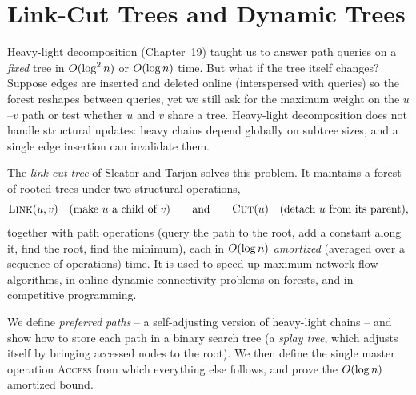 \chapter{Link-Cut Trees and Dynamic Trees}

Heavy-light decomposition (Chapter~19) taught us to answer path queries on a
\emph{fixed} tree in $O(\log^2 n)$ or $O(\log n)$ time. But what if the tree
itself changes? Suppose edges are inserted and deleted online (interspersed with queries) so the forest reshapes between
queries, yet we still ask for the maximum weight on the $u$--$v$ path or test
whether $u$ and $v$ share a tree. Heavy-light decomposition does not handle
structural updates: heavy chains depend globally on subtree sizes, and a single
edge insertion can invalidate them.

The \emph{link-cut tree} of Sleator and Tarjan solves this problem. It maintains a
forest of rooted trees under two structural operations,
\[
  \textsc{Link}(u,v) \quad\text{(make $u$ a child of $v$)}
  \qquad\text{and}\qquad
  \textsc{Cut}(u) \quad\text{(detach $u$ from its parent)},
\]
together with path operations (query the path to the root, add a constant along
it, find the root, find the minimum), each in $O(\log n)$ \emph{amortized}
(averaged over a sequence of operations) time. It is used to speed up maximum network flow algorithms,
in online dynamic connectivity problems on forests, and in competitive programming.

We define \emph{preferred paths} -- a self-adjusting version of heavy-light chains -- and show
how to store each path in a binary search tree (a \emph{splay tree}, which adjusts itself by bringing accessed nodes to the root). We then define the single
master operation \textsc{Access} from which everything else follows, and
prove the $O(\log n)$ amortized bound.

